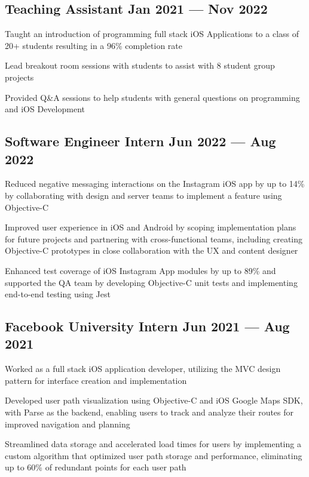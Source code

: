 
\subsection{{Teaching Assistant \hfill Jan 2021 --- Nov 2022}}
\begin{zitemize}
\item Taught an introduction of programming full stack iOS Applications to a class of 20+ students resulting in a 96\% completion rate
\item Lead breakout room sessions with students to assist with 8 student group projects
\item Provided Q\&A sessions to help students with general questions on programming and iOS Development
\end{zitemize}


\subsection{{Software Engineer Intern \hfill Jun 2022 --- Aug 2022}}
\begin{zitemize}
\item Reduced negative messaging interactions on the Instagram iOS app by up to 14\% by collaborating with design and server teams to implement a feature using Objective-C
\item Improved user experience in iOS and Android by scoping implementation plans for future projects and partnering with cross-functional teams, including creating Objective-C prototypes in close collaboration with the UX and content designer
\item Enhanced test coverage of iOS Instagram App modules by up to 89\% and supported the QA team by developing Objective-C unit tests and implementing end-to-end testing using Jest
\end{zitemize}

% 
\subsection{{Facebook University Intern \hfill Jun 2021 --- Aug 2021}}
\begin{zitemize}
\item Worked as a full stack iOS application developer, utilizing the MVC design pattern for interface creation and implementation
\item Developed user path visualization using Objective-C and iOS Google Maps SDK, with Parse as the backend, enabling users to track and analyze their routes for improved navigation and planning
\item Streamlined data storage and accelerated load times for users by implementing a custom algorithm that optimized user path storage and performance, eliminating up to 60\% of redundant points for each user path
\end{zitemize}

